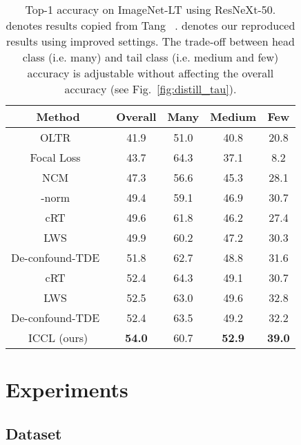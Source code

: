 
\begin{table*}[!t]
	
	\centering
	\begin{tabular}	{c|c c c c}
	\hline	 	 	
			Method & Overall & Many & Medium & Few \\
			
		\hline	 
			OLTR~\cite{oltr} & 41.9  & 51.0 & 40.8 & 20.8 \\
			Focal Loss~\cite{focal}  & 43.7  & 64.3 & 37.1 & 8.2 \\

			NCM~\cite{decouple-longtail}  & 47.3 & 56.6 & 45.3 & 28.1 \\
			-norm~\cite{decouple-longtail}  & 49.4 & 59.1 & 46.9 & 30.7 \\ 
			cRT~\cite{decouple-longtail}  & 49.6 & 61.8 & 46.2 & 27.4 \\ 
			LWS~\cite{decouple-longtail} & 49.9 & 60.2 & 47.2 & 30.3 \\
			De-confound-TDE~\cite{tang2020longtailed}  & 51.8 & 62.7 & 48.8 & 31.6 \\ 
	\hline	 
			cRT~\cite{decouple-longtail}& 52.4 & 64.3  & 49.1 & 30.7 \\  
			LWS~\cite{decouple-longtail}  & 52.5 & 63.0 & 49.6 & 32.8 \\ 
			De-confound-TDE~\cite{tang2020longtailed}  & 52.4 &  63.5 &  49.2 & 32.2 \\

			ICCL (ours) & \textbf{54.0}  & 60.7 & \textbf{52.9}  & \textbf{39.0} \\
	\hline	 
	\end{tabular}

    \vspace{-1ex}
	\caption
		{\small	
		Top-1 accuracy on ImageNet-LT using ResNeXt-50.  denotes results copied from Tang \etal ~\cite{tang2020longtailed}.  denotes our reproduced results using improved settings. 
		The trade-off between head class (i.e. many) and tail class (i.e. medium and few) accuracy is adjustable without affecting the overall accuracy (see Fig.~\ref{fig:distill_tau}).
		}
	\label{tbl:imagenetlt_resnext}
\vspace{-2ex}
\end{table*}		

 
\section{Experiments}
\label{sec:experiment}
\subsection{Dataset}


